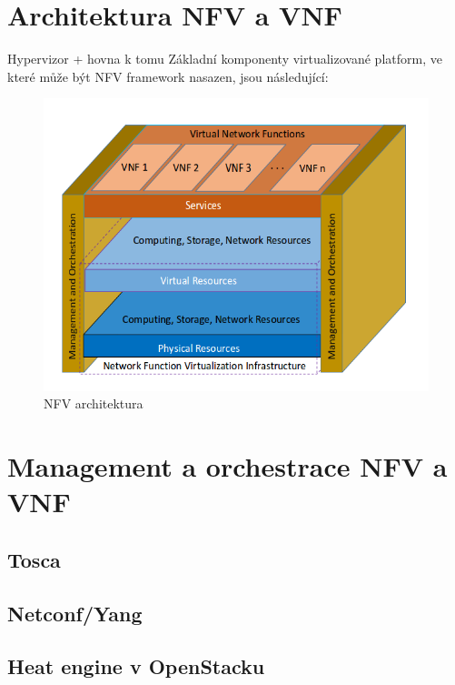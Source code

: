 \section{Architektura NFV a VNF}\label{sub:interaction}

Hypervizor + hovna k tomu
Základní komponenty virtualizované platform, ve které může být NFV framework nasazen, jsou následující:


\begin{figure}[h]
\begin{centering}
\includegraphics[scale=0.5]{images/NFV_architektura}
\par\end{centering}
\caption{NFV architektura\label{fig:NFV_architektura}}
\end{figure}


\section{Management a orchestrace NFV a VNF}\label{sub:interaction}

	\subsection{Tosca}\label{sub:interaction}

	\subsection{Netconf/Yang}\label{sub:interaction}

	\subsection{Heat engine v OpenStacku}\label{sub:interaction}

